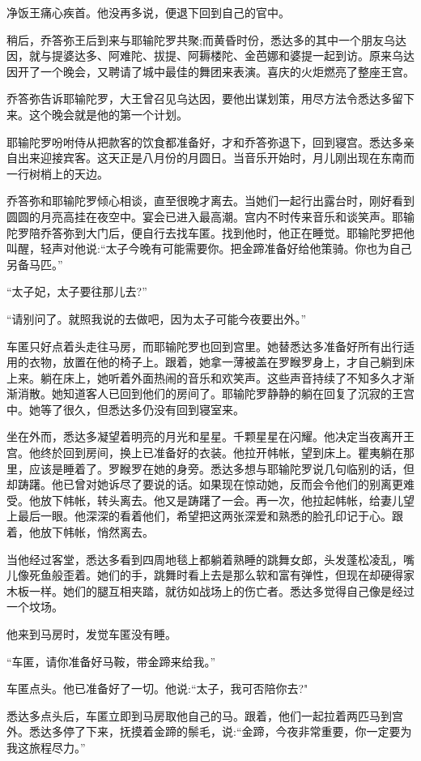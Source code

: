 \documentclass[12pt,twoside,openany]{book}
\begin{document}
净饭王痛心疾首。他没再多说，便退下回到自己的官中。

稍后，乔答弥王后到来与耶输陀罗共聚;而黄昏时份，悉达多的其中一个朋友乌达因，就与提婆达多、阿难陀、拔提、阿耨楼陀、金芭娜和婆提一起到访。原来乌达因开了一个晚会，又聘请了城中最佳的舞团来表演。喜庆的火炬燃亮了整座王宫。

乔答弥告诉耶输陀罗，大王曾召见乌达因，要他出谋划策，用尽方法令悉达多留下来。这个晚会就是他的第一个计划。

耶输陀罗吩咐侍从把款客的饮食都准备好，才和乔答弥退下，回到寝宫。悉达多亲自出来迎接宾客。这天正是八月份的月圆日。当音乐开始时，月儿刚出现在东南而一行树梢上的天边。

乔答弥和耶输陀罗倾心相谈，直至很晚才离去。当她们一起行出露台时，刚好看到圆圆的月亮高挂在夜空中。宴会已进入最高潮。宫内不时传来音乐和谈笑声。耶输陀罗陪乔答弥到大门后，便自行去找车匿。找到他时，他正在睡觉。耶输陀罗把他叫醒，轻声对他说:“太子今晚有可能需要你。把金蹄准备好给他策骑。你也为自己另备马匹。”

“太子妃，太子要往那儿去?”

“请别问了。就照我说的去做吧，因为太子可能今夜要出外。”

车匿只好点着头走往马房，而耶输陀罗也回到宫里。她替悉达多准备好所有出行适用的衣物，放置在他的椅子上。跟着，她拿一薄被盖在罗睺罗身上，才自己躺到床上来。躺在床上，她听着外面热闹的音乐和欢笑声。这些声音持续了不知多久才渐渐消散。她知道客人已回到他们的房间了。耶输陀罗静静的躺在回复了沉寂的王宫中。她等了很久，但悉达多仍没有回到寝室来。

坐在外而，悉达多凝望着明亮的月光和星星。千颗星星在闪耀。他决定当夜离开王宫。他终於回到房间，换上已准备好的衣装。他拉开帏帐，望到床上。瞿夷躺在那里，应该是睡着了。罗睺罗在她的身旁。悉达多想与耶输陀罗说几句临别的话，但却踌躇。他已曾对她诉尽了要说的话。如果现在惊动她，反而会令他们的别离更难受。他放下帏帐，转头离去。他又是踌躇了一会。再一次，他拉起帏帐，给妻儿望上最后一眼。他深深的看着他们，希望把这两张深爱和熟悉的脸孔印记于心。跟着，他放下帏帐，悄然离去。

当他经过客堂，悉达多看到四周地毯上都躺着熟睡的跳舞女郎，头发蓬松凌乱，嘴儿像死鱼般歪着。她们的手，跳舞时看上去是那么软和富有弹性，但现在却硬得家木板一样。她们的腿互相夹踏，就彷如战场上的伤亡者。悉达多觉得自己像是经过一个坟场。

他来到马房时，发觉车匿没有睡。

“车匿，请你准备好马鞍，带金蹄来给我。”

车匿点头。他已准备好了一切。他说:“太子，我可否陪你去?"

悉达多点头后，车匿立即到马房取他自己的马。跟着，他们一起拉着两匹马到宫外。悉达多停了下来，抚摸着金蹄的鬃毛，说:“金蹄，今夜非常重要，你一定要为我这旅程尽力。”
\end{document}

